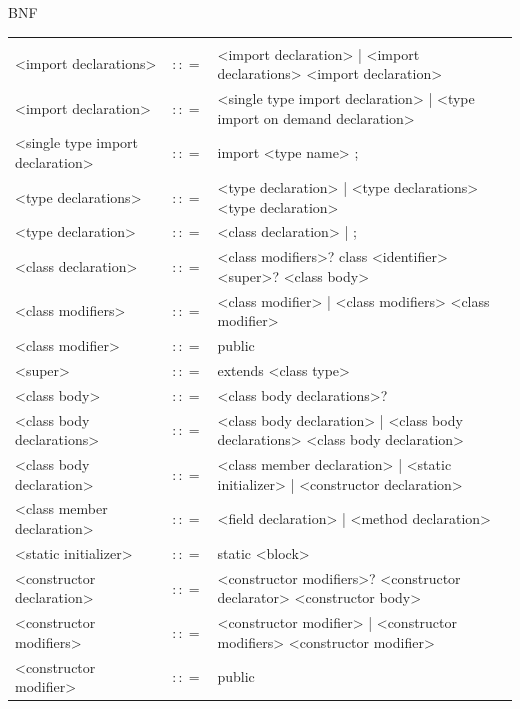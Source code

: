 \documentclass[landscape, 11pt]{article}
\begin{document}
\begin{qsection}{BNF}
\begin{enumerate}[label=\bt{\theenumi.}]
			\begin{longtable}{R{7cm} c L{15cm}}
													&					&	 \\
				<import declarations>						&	$\colon\colon=$	&	<import declaration> | <import declarations> <import declaration>
				\\
				<import declaration>						&	$\colon\colon=$	&	<single type import declaration> | <type import on demand declaration>
				\\
				<single type import declaration>			&	$\colon\colon=$	&	import <type name> ;
				\\
				<type declarations>							&	$\colon\colon=$	&	<type declaration> | <type declarations> <type declaration>
				\\
				<type declaration>							&	$\colon\colon=$	&	<class declaration> | ;
				\\
				<class declaration>							&	$\colon\colon=$	&	<class modifiers>? class <identifier> <super>? <class body>
				\\
				<class modifiers>							&	$\colon\colon=$	&	<class modifier> | <class modifiers> <class modifier>
				\\
				<class modifier>							&	$\colon\colon=$	&	public
				\\
				<super>										&	$\colon\colon=$	&	extends <class type>
				\\
				<class body>								&	$\colon\colon=$	&	{ <class body declarations>? }
				\\
				<class body declarations>					&	$\colon\colon=$	&	<class body declaration> | <class body declarations> <class body declaration>
				\\
				<class body declaration>					&	$\colon\colon=$	&	<class member declaration> | <static initializer> | <constructor declaration>
				\\
				<class member declaration>					&	$\colon\colon=$	&	<field declaration> | <method declaration>
				\\
				<static initializer>						&	$\colon\colon=$	&	static <block>
				\\
				<constructor declaration>					&	$\colon\colon=$	&	<constructor modifiers>? <constructor declarator> <constructor body>
				\\
				<constructor modifiers>						&	$\colon\colon=$	&	<constructor modifier> | <constructor modifiers> <constructor modifier>
				\\
				<constructor modifier>						&	$\colon\colon=$	&	public
				\\

\end{longtable}
\end{enumerate}
\end{qsection}
\end{document}
